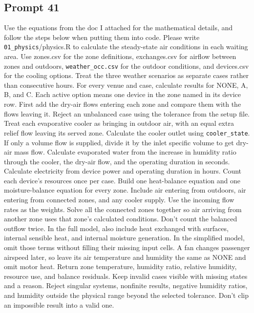 \subsection*{Prompt 41}
Use the equations from the doc I attached for the mathematical details, and follow the steps below when putting them into code. Please write \nolinkurl{01_physics}/physics.R to calculate the steady-state air conditions in each waiting area. Use zones.csv for the zone definitions, exchanges.csv for airflow between zones and outdoors, \nolinkurl{weather_occ.csv} for the outdoor conditions, and devices.csv for the cooling options. Treat the three weather scenarios as separate cases rather than consecutive hours.
For every venue and case, calculate results for NONE, A, B, and C. Each active option means one device in the zone named in its device row. First add the dry-air flows entering each zone and compare them with the flows leaving it. Reject an unbalanced case using the tolerance from the setup file.
Treat each evaporative cooler as bringing in outdoor air, with an equal extra relief flow leaving its served zone. Calculate the cooler outlet using \nolinkurl{cooler_state}. If only a volume flow is supplied, divide it by the inlet specific volume to get dry-air mass flow. Calculate evaporated water from the increase in humidity ratio through the cooler, the dry-air flow, and the operating duration in seconds. Calculate electricity from device power and operating duration in hours. Count each device’s resources once per case.
Build one heat-balance equation and one moisture-balance equation for every zone. Include air entering from outdoors, air entering from connected zones, and any cooler supply. Use the incoming flow rates as the weights. Solve all the connected zones together so air arriving from another zone uses that zone’s calculated conditions. Don’t count the balanced outflow twice.
In the full model, also include heat exchanged with surfaces, internal sensible heat, and internal moisture generation. In the simplified model, omit those terms without filling their missing input cells. A fan changes passenger airspeed later, so leave its air temperature and humidity the same as NONE and omit motor heat.
Return zone temperature, humidity ratio, relative humidity, resource use, and balance residuals. Keep invalid cases visible with missing states and a reason. Reject singular systems, nonfinite results, negative humidity ratios, and humidity outside the physical range beyond the selected tolerance. Don’t clip an impossible result into a valid one.

